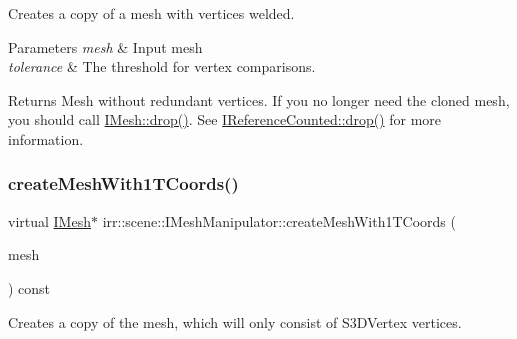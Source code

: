 Creates a copy of a mesh with vertices welded. 


\begin{DoxyParams}{Parameters}
{\em mesh} & Input mesh \\
\hline
{\em tolerance} & The threshold for vertex comparisons. \\
\hline
\end{DoxyParams}
\begin{DoxyReturn}{Returns}
Mesh without redundant vertices. If you no longer need the cloned mesh, you should call \hyperlink{classirr_1_1IReferenceCounted_a03856a09355b89d178090c4a5f738543}{I\+Mesh\+::drop()}. See \hyperlink{classirr_1_1IReferenceCounted_a03856a09355b89d178090c4a5f738543}{I\+Reference\+Counted\+::drop()} for more information. 
\end{DoxyReturn}
\mbox{\label{classirr_1_1scene_1_1IMeshManipulator_af7feb558fbaad9671667d1332c83bb5d}} 
\subsubsection{\texorpdfstring{create\+Mesh\+With1\+T\+Coords()}{createMeshWith1TCoords()}\hspace{0.1cm}{\footnotesize\ttfamily [1/2]}}
{\footnotesize\ttfamily virtual \hyperlink{classirr_1_1scene_1_1IMesh}{I\+Mesh}$\ast$ irr\+::scene\+::\+I\+Mesh\+Manipulator\+::create\+Mesh\+With1\+T\+Coords (\begin{DoxyParamCaption}\item[{\hyperlink{classirr_1_1scene_1_1IMesh}{I\+Mesh} $\ast$}]{mesh }\end{DoxyParamCaption}) const\hspace{0.3cm}{\ttfamily [pure virtual]}}



Creates a copy of the mesh, which will only consist of S3\+D\+Vertex vertices. 


